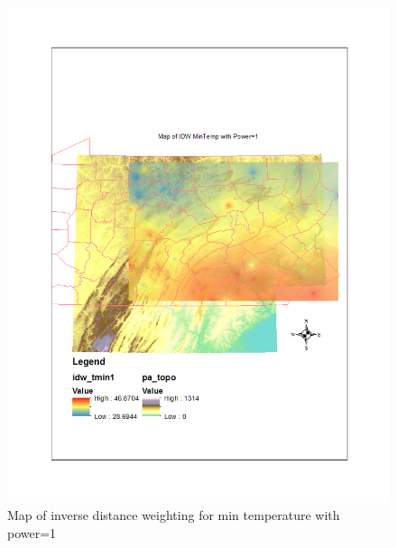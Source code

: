 \documentclass{article}\usepackage[]{graphicx}\usepackage[]{color}
\begin{document}
\begin{figure}
\includegraphics[scale=.9]{./figure/IDWmin1}
\caption{Map of inverse distance weighting for min temperature with power=1}
\label{idwmin1}
\end{figure}
\end{document}
